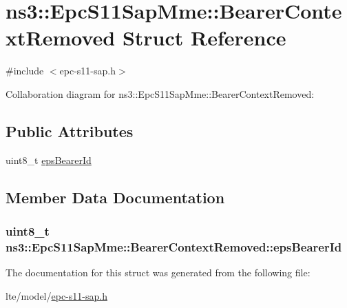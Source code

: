 \hypertarget{structns3_1_1EpcS11SapMme_1_1BearerContextRemoved}{}\section{ns3\+:\+:Epc\+S11\+Sap\+Mme\+:\+:Bearer\+Context\+Removed Struct Reference}
\label{structns3_1_1EpcS11SapMme_1_1BearerContextRemoved}


{\ttfamily \#include $<$epc-\/s11-\/sap.\+h$>$}



Collaboration diagram for ns3\+:\+:Epc\+S11\+Sap\+Mme\+:\+:Bearer\+Context\+Removed\+:
\subsection*{Public Attributes}
\begin{DoxyCompactItemize}
\item 
uint8\+\_\+t \hyperlink{structns3_1_1EpcS11SapMme_1_1BearerContextRemoved_abc66f18a29aea997bc08aa6088a2e560}{eps\+Bearer\+Id}
\end{DoxyCompactItemize}


\subsection{Member Data Documentation}
\subsubsection[{\texorpdfstring{eps\+Bearer\+Id}{epsBearerId}}]{\setlength{\rightskip}{0pt plus 5cm}uint8\+\_\+t ns3\+::\+Epc\+S11\+Sap\+Mme\+::\+Bearer\+Context\+Removed\+::eps\+Bearer\+Id}\hypertarget{structns3_1_1EpcS11SapMme_1_1BearerContextRemoved_abc66f18a29aea997bc08aa6088a2e560}{}\label{structns3_1_1EpcS11SapMme_1_1BearerContextRemoved_abc66f18a29aea997bc08aa6088a2e560}


The documentation for this struct was generated from the following file\+:\begin{DoxyCompactItemize}
\item 
lte/model/\hyperlink{epc-s11-sap_8h}{epc-\/s11-\/sap.\+h}\end{DoxyCompactItemize}
